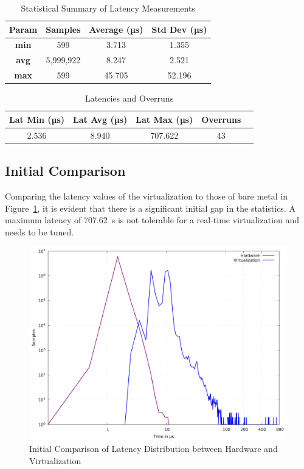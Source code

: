 \documentclass[MMR,Master,english]{twbook}
\begin{document}
\begin{table}[H]
	\centering
	\caption{Statistical Summary of Latency Measurements}
	\label{tab:latency_stats_virt}
	\begin{tabular}{|c|c|c|c|}
		\hline
		\textbf{Param} & \textbf{Samples} & \textbf{Average (µs)} & \textbf{Std Dev (µs)} \\ \hline
		\textbf{min}   & 599              & 3.713                 & 1.355                 \\ \hline
		\textbf{avg}   & 5,999,922        & 8.247                 & 2.521                 \\ \hline
		\textbf{max}   & 599              & 45.705                & 52.196                \\ \hline
	\end{tabular}
\end{table}

\begin{table}[H]
	\centering
	\caption{Latencies and Overruns}
	\label{tab:latency_overrun_msw_new_virt}
	\begin{tabular}{|c|c|c|c|c|}
		\hline
		\textbf{Lat Min (µs)} & \textbf{Lat Avg (µs)} & \textbf{Lat Max (µs)} & \textbf{Overruns} \\ \hline
		2.536                 & 8.940                 & 707.622               & 43                \\ \hline
	\end{tabular}
\end{table}

\subsection{Initial Comparison}
\noindent Comparing the latency values of the virtualization to those of bare metal in Figure~\ref{fig:gnuplot_max_latency_combined}, it is evident that there is a significant initial gap in the statistics. A maximum latency of 707.62~\textmu s is not tolerable for a real-time virtualization and needs to be tuned.

\begin{figure}[H]
	\centering
	\includegraphics[width=0.7\columnwidth]{masterthesis-documentation/docs/sigmatek/xenomai/01combined/gnuplot_combined_max_latency.png}
	\caption[Initial Comparison of Latency Distribution between Hardware and Virtualization]{Initial Comparison of Latency Distribution between Hardware and Virtualization}
	\label{fig:gnuplot_max_latency_combined}
\end{figure}
\end{document}
